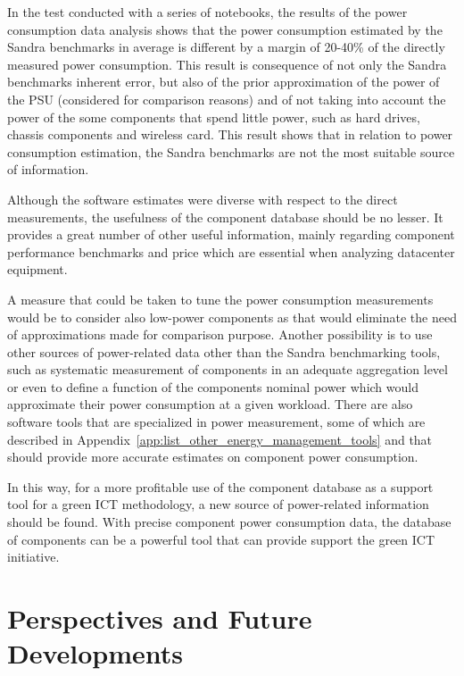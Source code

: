     In the test conducted with a series of notebooks, the results of the power consumption data analysis shows that the power consumption estimated by the Sandra benchmarks in average is different by a margin of 20-40\% of the directly measured power consumption. This result is consequence of not only the Sandra benchmarks inherent error, but also of the prior approximation of the power of the PSU (considered for comparison reasons) and of not taking into account the power of the some components that spend little power, such as hard drives, chassis components and wireless card. This result shows that in relation to power consumption estimation, the Sandra benchmarks are not the most suitable source of information.
    
    Although the software estimates were diverse with respect to the direct measurements, the usefulness of the component database should be no lesser. It provides a great number of other useful information, mainly regarding component performance benchmarks and price which are essential when analyzing datacenter equipment.
    
    A measure that could be taken to tune the power consumption measurements would be to consider also low-power components as that would eliminate the need of approximations made for comparison purpose. Another possibility is to use other sources of power-related data other than the Sandra benchmarking tools, such as systematic measurement of components in an adequate aggregation level or even to define a function of the components nominal power which would approximate their power consumption at a given workload. There are also software tools that are specialized in power measurement, some of which are described in Appendix~\ref{app:list_other_energy_management_tools} and that should provide more accurate estimates on component power consumption.
    
    In this way, for a more profitable use of the component database as a support tool for a green ICT methodology, a new source of power-related information should be found. With precise component power consumption data, the database of components can be a powerful tool that can provide support the green ICT initiative.
    
    \pagebreak
    \section{Perspectives and Future Developments}


